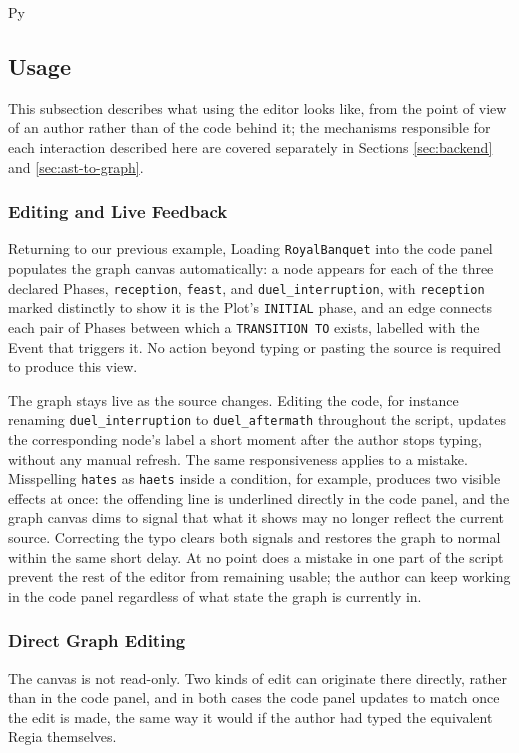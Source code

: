\begin{codeblock}[]{Py}
 \subsection{Usage}
\label{sec:editor-usage}
This subsection describes what using the editor looks like, from the point of view of an author rather than of the code behind it; the mechanisms responsible for each interaction described here are covered separately in Sections \ref{sec:backend} and \ref{sec:ast-to-graph}.

\subsubsection{Editing and Live Feedback}


Returning to our previous example, Loading \lstinline|RoyalBanquet| into the code panel populates the graph canvas automatically: a node appears for each of the three declared Phases, \lstinline|reception|, \lstinline|feast|, and \lstinline|duel_interruption|, with \lstinline|reception| marked distinctly to show it is the Plot's \lstinline|INITIAL| phase, and an edge connects each pair of Phases between which a \lstinline|TRANSITION TO| exists, labelled with the Event that triggers it. No action beyond typing or pasting the source is required to produce this view.

The graph stays live as the source changes. Editing the code, for instance renaming \lstinline|duel_interruption| to \lstinline|duel_aftermath| throughout the script, updates the corresponding node's label a short moment after the author stops typing, without any manual refresh. The same responsiveness applies to a mistake. Misspelling \lstinline|hates| as \lstinline|haets| inside a condition, for example, produces two visible effects at once: the offending line is underlined directly in the code panel, and the graph canvas dims to signal that what it shows may no longer reflect the current source. Correcting the typo clears both signals and restores the graph to normal within the same short delay. At no point does a mistake in one part of the script prevent the rest of the editor from remaining usable; the author can keep working in the code panel regardless of what state the graph is currently in.

\subsubsection{Direct Graph Editing}
The canvas is not read-only. Two kinds of edit can originate there directly, rather than in the code panel, and in both cases the code panel updates to match once the edit is made, the same way it would if the author had typed the equivalent Regia themselves.


\end{codeblock}
